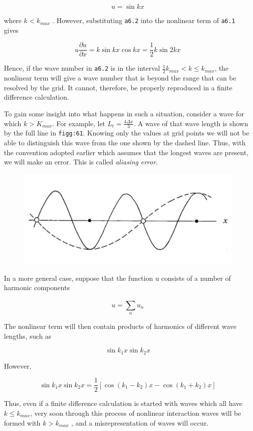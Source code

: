 \[u = \sin{kx}\]

where \({k < k}_{max}\) . However, substituting \texttt{a6.2} into the
nonlinear term of \texttt{a6.1} gives

\[u\frac{\partial u}{\partial x} = k\sin{kx}\cos{kx} = \frac{1}{2}k\sin{2kx}\]

Hence, if the wave number in \texttt{a6.2} is in the interval
\(\frac{1}{2}k_{max} < k \leq k_{max}\), the nonlinear term will give a
wave number that is beyond the range that can be resolved by the grid.
It cannot, therefore, be properly reproduced in a finite difference
calculation.

To gain some insight into what happens in such a situation, consider a
wave for which \(k > K_{max}\). For example, let
\(L_{t} = \frac{4\Delta x}{3}\). A wave of that wave length is shown by
the full line in \texttt{figg:61}. Knowing only the values at grid
points we will not be able to distinguish this wave from the one shown
by the dashed line. Thus, with the convention adopted earlier which
assumes that the longest waves are present, we will make an error. This
is called \emph{aliasing error}.

\begin{figure}
\centering
\includegraphics[width = .7 \textwidth]{figs/NM/pic61.jpg}
\caption{} \label{fig:}
\end{figure}

In a more general case, suppose that the function u consists of a number
of harmonic components

\[u = \sum_{n}^{}u_{n}\]

The nonlinear term will then contain products of harmonics of different
wave lengths, such as

\[\sin{k_1}x\sin{k_2}x\]

However,

\[\sin{k_1 x}\sin{k_2 x} = \frac{1}{2}
\left\lbrack \cos{( k_{1} - k_{2} )x - \cos{( k_{1} + k_{2} )x}} \right\rbrack\]

Thus, even if a finite difference calculation is started with waves
which all have \(k \leq k_{max}\), very soon through this process of
nonlinear interaction waves will be formed with \(k > k_{max}\) , and a
misrepresentation of waves will occur.

